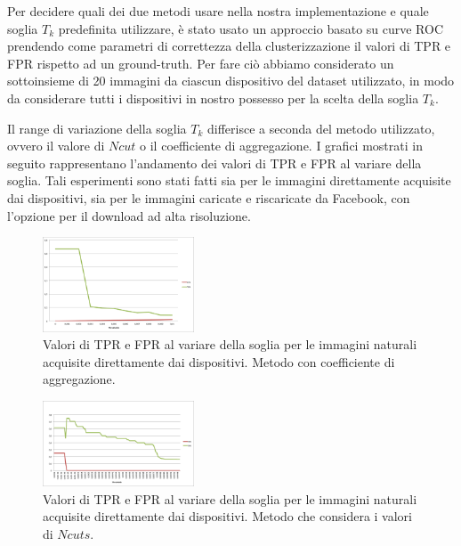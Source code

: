 Per decidere quali dei due metodi usare nella nostra implementazione e quale soglia $T_{k}$ predefinita utilizzare, è stato usato un approccio basato su curve ROC prendendo come parametri di correttezza della clusterizzazione il valori di TPR e FPR rispetto ad un ground-truth. Per fare ciò abbiamo considerato un sottoinsieme di 20 immagini da ciascun dispositivo del dataset utilizzato, in modo da considerare tutti i dispositivi in nostro possesso per la scelta della soglia $T_{k}$.

Il range di variazione della soglia $T_{k}$ differisce a seconda del metodo utilizzato, ovvero il valore di $Ncut$ o il coefficiente di aggregazione. I grafici mostrati in seguito rappresentano l'andamento dei valori di TPR e FPR al variare della soglia. Tali esperimenti sono stati fatti sia per le immagini direttamente acquisite dai dispositivi, sia per le immagini caricate e riscaricate da Facebook, con l'opzione per il download ad alta risoluzione.

\begin{figure}[h]
\begin{center}
\includegraphics[width=0.4\textwidth]{images/soglia_imgnat_AC.png}
\end{center}
  \caption{Valori di TPR e FPR al variare della soglia per le immagini naturali acquisite direttamente dai dispositivi. Metodo con coefficiente di aggregazione.}
\label{fig:soglia AC}
\end{figure}

\begin{figure}[h]
\begin{center}
\includegraphics[width=0.4\textwidth]{images/soglia_imgnat_NC.png}
\end{center}
  \caption{Valori di TPR e FPR al variare della soglia per le immagini naturali acquisite direttamente dai dispositivi. Metodo che considera i valori di $Ncuts$.}
\label{fig:soglia AC}
\end{figure}

